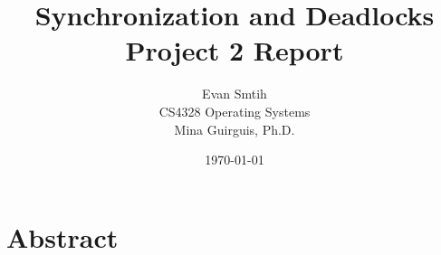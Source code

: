 \documentclass[12pt]{article}
\title{Synchronization and Deadlocks\\
        Project 2 Report\\}
\author{Evan Smtih\\
        CS4328 Operating Systems\\
        Mina Guirguis, Ph.D.\\}
\date{\today}
\begin{document}
\maketitle

\section{Abstract}
\end{document}

